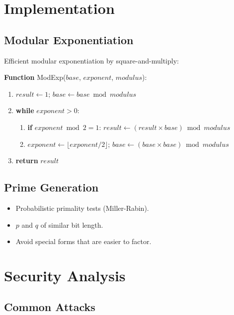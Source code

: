\section{Implementation}

\subsection{Modular Exponentiation}

Efficient modular exponentiation by square-and-multiply:

\begin{tcolorbox}[colback=blue!5!white,colframe=blue!75!black,
  title=Algorithm: Modular Exponentiation]
\textbf{Function} ModExp($base$, $exponent$, $modulus$):
\begin{enumerate}
  \item $result \gets 1$; $base \gets base \bmod modulus$
  \item \textbf{while} $exponent > 0$:
  \begin{enumerate}
    \item \textbf{if} $exponent \bmod 2 = 1$:
      $result \gets (result \times base) \bmod modulus$
    \item $exponent \gets \lfloor exponent/2 \rfloor$;
      $base \gets (base \times base) \bmod modulus$
  \end{enumerate}
  \item \textbf{return} $result$
\end{enumerate}
\end{tcolorbox}

\subsection{Prime Generation}

\begin{itemize}
  \item Probabilistic primality tests (Miller-Rabin).
  \item $p$ and $q$ of similar bit length.
  \item Avoid special forms that are easier to factor.
\end{itemize}

\section{Security Analysis}

\subsection{Common Attacks}

